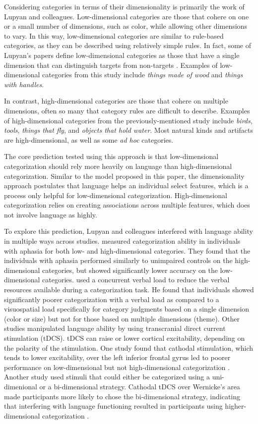 \documentclass[../dissertation.tex]{subfiles}
\begin{document}
Considering categories in terms of their dimensionality is primarily the work of Lupyan and colleagues. Low-dimensional categories are those that cohere on one or a small number of dimensions, such as color, while allowing other dimensions to vary. In this way, low-dimensional categories are similar to rule-based categories, as they can be described using relatively simple rules. In fact, some of Lupyan's papers define low-dimensional categories as those that have a single dimension that can distinguish targets from non-targets \citep{Lupyan2013}. Examples of low-dimensional categories from this study include \textit{things made of wood} and \textit{things with handles}. \par
	In contrast, high-dimensional categories are those that cohere on multiple dimensions, often so many that category rules are difficult to describe. Examples of high-dimensional categories from the previously-mentioned study include \textit{birds}, \textit{tools}, \textit{things that fly}, and \textit{objects that hold water}. Most natural kinds and artifacts are high-dimensional, as well as some \textit{ad hoc} categories. \par
	The core prediction tested using this approach is that low-dimensional categorization should rely more heavily on language than high-dimensional categorization. Similar to the model proposed in this paper, the dimensionality approach postulates that language helps an individual select features, which is a process only helpful for low-dimensional categorization. High-dimensional categorization relies on creating associations across multiple features, which does not involve language as highly. \par 
	To explore this prediction, Lupyan and colleagues interfered with language ability in multiple ways across studies. \citet{Lupyan2013} measured categorization ability in individuals with aphasia for both low- and high-dimensional categories. They found that the individuals with aphasia performed similarly to unimpaired controls on the high-dimensional categories, but showed significantly lower accuracy on the low-dimensional categories. \citet{Lupyan2009} used a concurrent verbal load to reduce the verbal resources available during a categorization task. He found that individuals showed significantly poorer categorization with a verbal load as compared to a visuospatial load specifically for category judgments based on a single dimension (color or size) but not for those based on multiple dimensions (theme). Other studies manipulated language ability by using transcranial direct current stimulation (tDCS). tDCS can raise or lower cortical excitability, depending on the polarity of the stimulation. One study found that cathodal stimulation, which tends to lower excitability, over the left inferior frontal gyrus led to poorer performance on low-dimensional but not high-dimensional categorization \citep{Lupyan2012b}. Another study used stimuli that could either be categorized using a uni-dimenional or a bi-dimensional strategy. Cathodal tDCS over Wernicke's area made participants more likely to chose the bi-dimensional strategy, indicating that interfering with language functioning resulted in participants using higher-dimensional categorization \citep{Perry2014}. \par 
\end{document}
